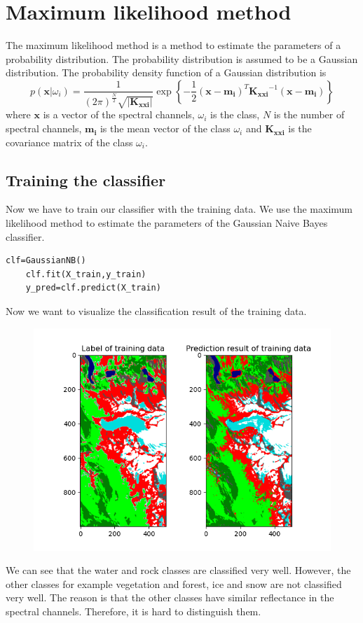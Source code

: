 \documentclass[12pt
,headinclude
,headsepline
,bibtotocnumbered
]{scrartcl}
\begin{document}
\section*{Maximum likelihood method}
The maximum likelihood method is a method to estimate the parameters of a probability distribution. The probability distribution is assumed to be a Gaussian distribution. The probability density function of a Gaussian distribution is
\begin{equation*}
    p(\boldsymbol{x}|\omega_i)=\frac{1}{(2\pi)^{\frac{N}{2}}\sqrt{|\boldsymbol{K_{xxi}}|}}\exp{\left\{-\frac{1}{2}(\boldsymbol{x}-\boldsymbol{m_i})^T\boldsymbol{K_{xxi}}^{-1}(\boldsymbol{x}-\boldsymbol{m_i})\right\}}
\end{equation*}
where $\boldsymbol{x}$ is a vector of the spectral channels, $\omega_i$ is the class, $N$ is the number of spectral channels, $\boldsymbol{m_i}$ is the mean vector of the class $\omega_i$ and $\boldsymbol{K_{xxi}}$ is the covariance matrix of the class $\omega_i$.
\subsection*{Training the classifier}
Now we have to train our classifier with the training data. We use the maximum likelihood method to estimate the parameters of the Gaussian Naive Bayes classifier.
\begin{lstlisting}[breaklines=true]
    clf=GaussianNB()
    clf.fit(X_train,y_train)
    y_pred=clf.predict(X_train)
\end{lstlisting}
Now we want to visualize the classification result of the training data.
\begin{figure}[H]
\centering
\includegraphics[width=1\textwidth]{plots/train_result.png}
\end{figure}
We can see that the water and rock classes are classified very well. However, the other classes for example vegetation and forest, ice and snow are not classified very well. The reason is that the other classes have similar reflectance in the spectral channels. Therefore, it is hard to distinguish them.
\end{document}
